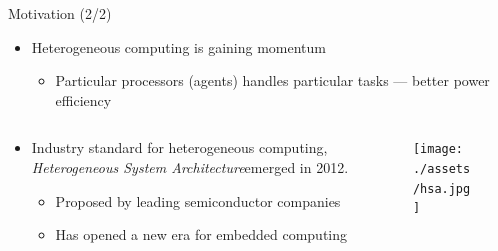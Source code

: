 \documentclass{beamer}
\begin{document}
\begin{CJK}{UTF8}{bkai}
    \begin{frame}{Motivation (2/2)}
                \begin{itemize}
                    \pause
                    \item {
                            Heterogeneous computing is gaining momentum
                            \begin{itemize}
                                \item Particular processors (agents) handles particular tasks --- better power efficiency
                            \end{itemize}
                        }
                \end{itemize}
                \pause
                \begin{columns}
                    \begin{column}{0.75\textwidth}
                        \begin{itemize}
                            \item {
                                    Industry standard for heterogeneous computing, \textit{Heterogeneous System Architecture}\footnotemark emerged in 2012.
                                    \begin{itemize}
                                        \item {
                                                Proposed by leading semiconductor companies%
                                            }
                                        \item {
                                                Has opened a new era for embedded computing %
                                            }
                                    \end{itemize}
                                }
                        \end{itemize}
                    \end{column}
                    \begin{column}{0.25\textwidth}
                            \begin{figure}[!ht]
                                \centering
                                \texttt{[image: ./assets/hsa.jpg]}
                            \end{figure}
                    \end{column}
                \end{columns}

\end{frame}
\end{CJK}
\end{document}
